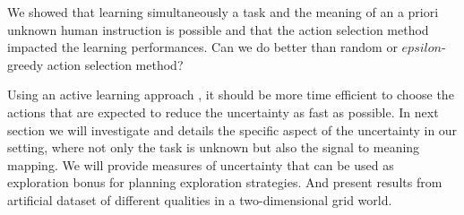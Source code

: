 \transition

We showed that learning simultaneously a task and the meaning of an a priori unknown human instruction is possible and that the action selection method impacted the learning performances. Can we do better than random or $epsilon$-greedy action selection method? 

Using an active learning approach \cite{settles2010active}, it should be more time efficient to choose the actions that are expected to reduce the uncertainty as fast as possible. In next section we will investigate and details the specific aspect of the uncertainty in our setting, where not only the task is unknown but also the signal to meaning mapping. We will provide measures of uncertainty that can be used as exploration bonus for planning exploration strategies. And present results from artificial dataset of different qualities in a two-dimensional grid world.



